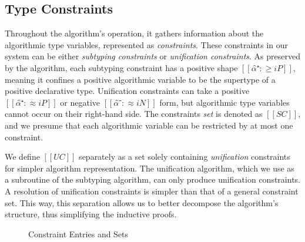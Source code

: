 \subsection{Type Constraints}
Throughout the algorithm's operation, it gathers information about the
algorithmic type variables, represented as \emph{constraints}. These constraints
in our system can be either \emph{subtyping constraints} or \emph{unification
constraints}. As preserved by the algorithm, each subtyping constraint has a
positive shape $[[α̂⁺ :≥ iP]]$, meaning it confines a positive algorithmic
variable to be the supertype of a positive declarative type. Unification
constraints can take a positive $[[α̂⁺ :≈ iP]]$ or negative $[[α̂⁻ :≈ iN]]$
form, but algorithmic type variables cannot occur on their right-hand side. The
constraints \emph{set} is denoted as $[[SC]]$, and we presume that each
algorithmic variable can be restricted by at most one constraint.

We define $[[UC]]$ separately as a set solely containing \emph{unification}
constraints for simpler algorithm representation. The unification algorithm,
which we use as a subroutine of the subtyping algorithm, can only produce
unification constraints. A resolution of unification constraints is simpler than
that of a general constraint set. This way, this separation allows us to better
decompose the algorithm's structure, thus simplifying the inductive proofs.

  \begin{figure}[t]
    \begin{minipage}{0.49\textwidth}
    \end{minipage}
    \begin{minipage}{0.49\textwidth}
    \end{minipage}
    \label{fig:syntax-e-sc}
    \caption{Constraint Entries and Sets}
  \end{figure}


